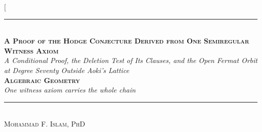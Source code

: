 \documentclass[10pt,twocolumn]{article}
\begin{document}
\twocolumn[{%
\begin{center}
{\color{accent}\rule{0.6\textwidth}{0.8pt}}\\[10pt]
{\bfseries\scshape\fontsize{20}{23}\selectfont A Proof of the Hodge
Conjecture Derived from One Semiregular Witness Axiom}\\[7pt]
{\itshape\large A Conditional Proof, the Deletion Test of Its Clauses,
and the Open Fermat Orbit at Degree Seventy Outside Aoki's
Lattice}\\[8pt]
{\footnotesize\color{accent}\scshape\bfseries Algebraic Geometry}\\[3pt]
{\itshape\color{deep}\small One witness axiom carries the whole
chain}\\[9pt]
{\color{accent}\rule{0.6\textwidth}{0.8pt}}\\[10pt]
{\scshape Mohammad F. Islam, PhD}\\[2pt]


\end{center}}
\end{document}
